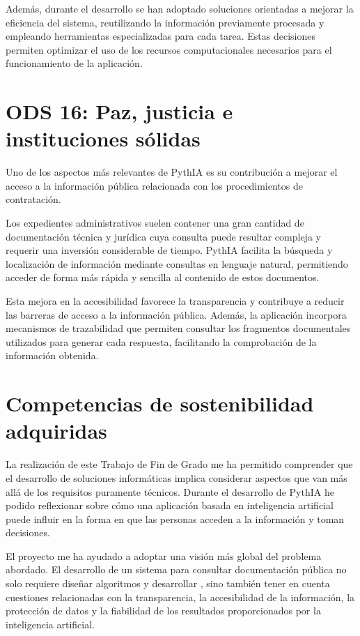 Además, durante el desarrollo se han adoptado soluciones orientadas a mejorar la eficiencia del sistema, reutilizando la información previamente procesada y empleando herramientas especializadas para cada tarea. Estas decisiones permiten optimizar el uso de los recursos computacionales necesarios para el funcionamiento de la aplicación.

\section{ODS 16: Paz, justicia e instituciones sólidas}

Uno de los aspectos más relevantes de PythIA es su contribución a mejorar el acceso a la información pública relacionada con los procedimientos de contratación.

Los expedientes administrativos suelen contener una gran cantidad de documentación técnica y jurídica cuya consulta puede resultar compleja y requerir una inversión considerable de tiempo. PythIA facilita la búsqueda y localización de información mediante consultas en lenguaje natural, permitiendo acceder de forma más rápida y sencilla al contenido de estos documentos.

Esta mejora en la accesibilidad favorece la transparencia y contribuye a reducir las barreras de acceso a la información pública. Además, la aplicación incorpora mecanismos de trazabilidad que permiten consultar los fragmentos documentales utilizados para generar cada respuesta, facilitando la comprobación de la información obtenida.

\section{Competencias de sostenibilidad adquiridas}

La realización de este Trabajo de Fin de Grado me ha permitido comprender que el desarrollo de soluciones informáticas implica considerar aspectos que van más allá de los requisitos puramente técnicos. Durante el desarrollo de PythIA he podido reflexionar sobre cómo una aplicación basada en inteligencia artificial puede influir en la forma en que las personas acceden a la información y toman decisiones.

El proyecto me ha ayudado a adoptar una visión más global del problema abordado. El desarrollo de un sistema para consultar documentación pública no solo requiere diseñar algoritmos y desarrollar , sino también tener en cuenta cuestiones relacionadas con la transparencia, la accesibilidad de la información, la protección de datos y la fiabilidad de los resultados proporcionados por la inteligencia artificial.

